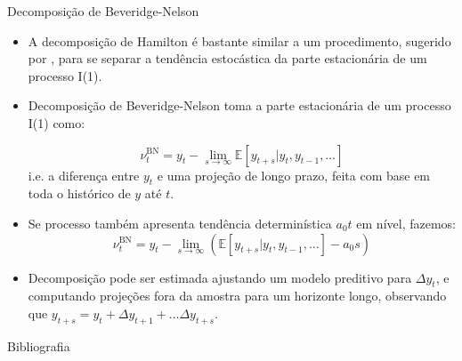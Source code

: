 \documentclass[11pt]{beamer}
\begin{document}
\begin{frame}{Decomposição de Beveridge-Nelson}
	\begin{itemize}
		\item A decomposição de Hamilton é bastante similar a um procedimento, sugerido por \citet{Beveridge1981}, para se separar a tendência estocástica da parte estacionária de um processo I(1).
		\item Decomposição de Beveridge-Nelson toma a parte estacionária de um processo I(1) como:
		
		$$\nu^{\text{BN}}_t = y_t - \lim_{s \to \infty} \mathbb{E}[y_{t+s}|y_t,y_{t-1},\ldots]$$
		i.e. a diferença entre $y_t$ e uma projeção de longo prazo, feita com base em toda o histórico de $y$ até $t$.
		\item Se processo também apresenta tendência determinística $a_0 t$ em nível, fazemos: 
			$$\nu^{\text{BN}}_t = y_t - \lim_{s \to \infty} ( \mathbb{E}[y_{t+s}|y_t,y_{t-1},\ldots] - a_0 s)$$
			\item Decomposição pode ser estimada ajustando um modelo preditivo para $\Delta y_t$, e computando projeções fora da amostra para um horizonte longo, observando que $y_{t+s} = y_t + \Delta y_{t+1} + \ldots \Delta y_{t+s}$.
	\end{itemize}
\end{frame}
\appendix
	\begin{frame}[allowframebreaks]{Bibliografia}
	\printbibliography
	\end{frame}
\end{document}
